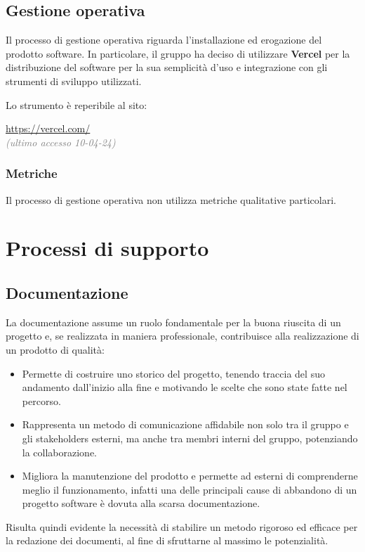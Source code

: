 \subsection{Gestione operativa}\label{sec:gestione_operativa}
Il processo di gestione operativa riguarda l'installazione ed erogazione del prodotto software.
In particolare, il gruppo ha deciso di utilizzare \textbf{Vercel} per la distribuzione del software per la sua semplicità d'uso e integrazione con gli strumenti di sviluppo utilizzati.

\noindent Lo strumento è reperibile al sito:
\begin{center}
    \url{https://vercel.com/}\\ \textcolor{gray}{\textit{(ultimo accesso 10-04-24)}}
\end{center}

\subsubsection{Metriche}\label{sec:processi_primari:gestione_operativa:metriche}
Il processo di gestione operativa non utilizza metriche qualitative particolari.


\newpage
\section{Processi di supporto}\label{sec:processi_di_supporto}

\subsection{Documentazione}\label{sec:processi_di_supporto:documentazione}
La documentazione assume un ruolo fondamentale per la buona riuscita di un progetto e, se realizzata in maniera professionale, contribuisce alla realizzazione di un prodotto di qualità:
\begin{itemize}
    \item Permette di costruire uno storico del progetto, tenendo traccia del suo andamento dall'inizio alla fine e motivando le scelte che sono state fatte nel percorso.
    \item Rappresenta un metodo di comunicazione affidabile non solo tra il gruppo e gli stakeholders esterni, ma anche tra membri interni del gruppo, potenziando la collaborazione.
    \item Migliora la manutenzione del prodotto e permette ad esterni di comprenderne meglio il funzionamento, infatti una delle principali cause di abbandono di un progetto software è dovuta alla scarsa documentazione.
\end{itemize}
Risulta quindi evidente la necessità di stabilire un metodo rigoroso ed efficace per la redazione dei documenti, al fine di sfruttarne al massimo le potenzialità.
